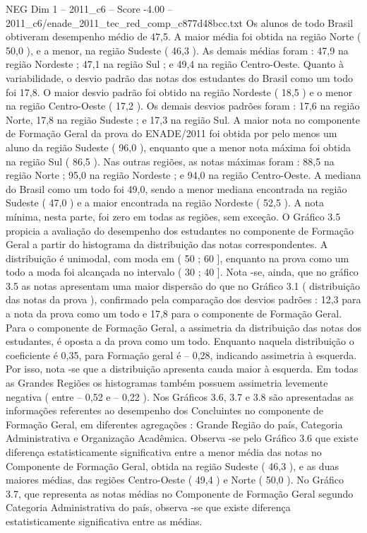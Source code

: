 \begin{textsample}{NEG Dim 1 – 2011\_c6 – Score -4.00 – 2011\_c6/enade\_2011\_tec\_red\_comp\_c877d48bcc.txt}
Os alunos de todo Brasil obtiveram desempenho médio de 47,5.
A maior média foi obtida na região Norte ( 50,0 ), e a menor, na região Sudeste ( 46,3 ).
As demais médias foram : 47,9 na região Nordeste ; 47,1 na região Sul ; e 49,4 na região Centro-Oeste.
Quanto à variabilidade, o desvio padrão das notas dos estudantes do Brasil como um todo foi 17,8.
O maior desvio padrão foi obtido na região Nordeste ( 18,5 ) e o menor na região Centro-Oeste ( 17,2 ).
Os demais desvios padrões foram : 17,6 na região Norte, 17,8 na região Sudeste ; e 17,3 na região Sul.
A maior nota no componente de Formação Geral da prova do ENADE/2011 foi obtida por pelo menos um aluno da região Sudeste ( 96,0 ), enquanto que a menor nota máxima foi obtida na região Sul ( 86,5 ).
Nas outras regiões, as notas máximas foram : 88,5 na região Norte ; 95,0 na região Nordeste ; e 94,0 na região Centro-Oeste.
A mediana do Brasil como um todo foi 49,0, sendo a menor mediana encontrada na região Sudeste ( 47,0 ) e a maior encontrada na região Nordeste ( 52,5 ).
A nota mínima, nesta parte, foi zero em todas as regiões, sem exceção.
O Gráfico 3.5 propicia a avaliação do desempenho dos estudantes no componente de Formação Geral a partir do histograma da distribuição das notas correspondentes.
A distribuição é unimodal, com moda em ( 50 ; 60 ], enquanto na prova como um todo a moda foi alcançada no intervalo ( 30 ; 40 ].
Nota -se, ainda, que no gráfico 3.5 as notas apresentam uma maior dispersão do que no Gráfico 3.1 ( distribuição das notas da prova ), confirmado pela comparação dos desvios padrões : 12,3 para a nota da prova como um todo e 17,8 para o componente de Formação Geral.
Para o componente de Formação Geral, a assimetria da distribuição das notas dos estudantes, é oposta a da prova como um todo.
Enquanto naquela distribuição o coeficiente é 0,35, para Formação geral é – 0,28, indicando assimetria à esquerda.
Por isso, nota -se que a distribuição apresenta cauda maior à esquerda.
Em todas as Grandes Regiões os histogramas também possuem assimetria levemente negativa ( entre – 0,52 e – 0,22 ).
Nos Gráficos 3.6, 3.7 e 3.8 são apresentadas as informações referentes ao desempenho dos Concluintes no componente de Formação Geral, em diferentes agregações : Grande Região do país, Categoria Administrativa e Organização Acadêmica.
Observa -se pelo Gráfico 3.6 que existe diferença estatisticamente significativa entre a menor média das notas no Componente de Formação Geral, obtida na região Sudeste ( 46,3 ), e as duas maiores médias, das regiões Centro-Oeste ( 49,4 ) e Norte ( 50,0 ).
No Gráfico 3.7, que representa as notas médias no Componente de Formação Geral segundo Categoria Administrativa do país, observa -se que existe diferença estatisticamente significativa entre as médias.

\end{textsample}
